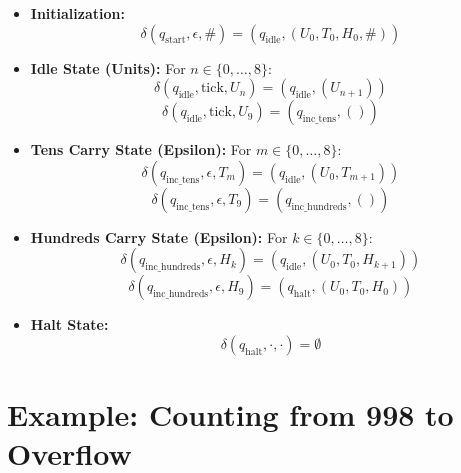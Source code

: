 \documentclass[11pt]{article}
\begin{document}
\begin{itemize}
    \item \textbf{Initialization:}
        \[ \delta(q_{\text{start}}, \epsilon, \#) = (q_{\text{idle}}, (U_0, T_0, H_0, \#)) \]
        
    \item \textbf{Idle State (Units):} For $n \in \{0, \ldots, 8\}$:
        \[ \delta(q_{\text{idle}}, \text{tick}, U_n) = (q_{\text{idle}}, (U_{n+1})) \]
        \[ \delta(q_{\text{idle}}, \text{tick}, U_9) = (q_{\text{inc\_tens}}, ()) \] %
        
    \item \textbf{Tens Carry State (Epsilon):} For $m \in \{0, \ldots, 8\}$:
        \[ \delta(q_{\text{inc\_tens}}, \epsilon, T_m) = (q_{\text{idle}}, (U_0, T_{m+1})) \] %
        \[ \delta(q_{\text{inc\_tens}}, \epsilon, T_9) = (q_{\text{inc\_hundreds}}, ()) \] %
        
    \item \textbf{Hundreds Carry State (Epsilon):} For $k \in \{0, \ldots, 8\}$:
        \[ \delta(q_{\text{inc\_hundreds}}, \epsilon, H_k) = (q_{\text{idle}}, (U_0, T_0, H_{k+1})) \] %
        \[ \delta(q_{\text{inc\_hundreds}}, \epsilon, H_9) = (q_{\text{halt}}, (U_0, T_0, H_0)) \] %
        
    \item \textbf{Halt State:}
        \[ \delta(q_{\text{halt}}, \cdot, \cdot) = \emptyset \]
\end{itemize}

\section{Example: Counting from 998 to Overflow} \label{sec:example_overflow_3digit}
\end{document}
